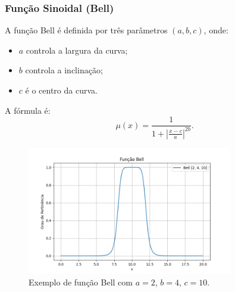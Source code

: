 \documentclass[a4paper,12pt]{article}
\begin{document}
\subsubsection{Função Sinoidal (Bell)}
A função Bell é definida por três parâmetros $(a, b, c)$, onde:
\begin{itemize}
    \item $a$ controla a largura da curva;
    \item $b$ controla a inclinação;
    \item $c$ é o centro da curva.
\end{itemize}
A fórmula é:
\[
\mu(x) = \frac{1}{1 + \left|\frac{x - c}{a}\right|^{2b}}.
\]
\begin{figure}[H]
    \centering
    \includegraphics[width=0.8\textwidth]{img/bell.png}
    \caption{Exemplo de função Bell com $a=2$, $b=4$, $c=10$.}
    \label{fig:funcao_bell}
\end{figure}
\end{document}
